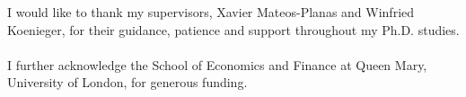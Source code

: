 
\begin{onehalfspacing}
\begin{acknowledgements}      %

\thispagestyle{plain}

I would like to thank my supervisors, Xavier Mateos-Planas and Winfried Koenieger, for their guidance, patience and support throughout my Ph.D. studies.  \\\\
I further acknowledge the School of Economics and Finance at Queen Mary, University of London, for generous funding. 

\end{acknowledgements}
\end{onehalfspacing}